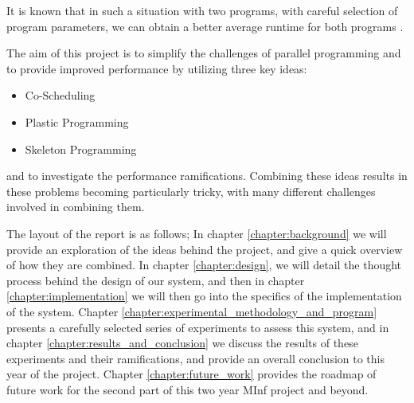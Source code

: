 It is known that in such a situation with two programs, with careful selection of program parameters, we can obtain a better average runtime for both programs \cite{lira}.

The aim of this project is to simplify the challenges of parallel programming and to provide improved performance by utilizing three key ideas:

\begin{itemize}
	\item Co-Scheduling
	\item Plastic Programming
	\item Skeleton Programming
\end{itemize}

and to investigate the performance ramifications. Combining these ideas results in these problems becoming particularly tricky, with many different challenges involved in combining them.

The layout of the report is as follows; In chapter \ref{chapter:background} we will provide an exploration of the ideas behind the project, and give a quick overview of how they are combined. In chapter \ref{chapter:design}, we will detail the thought process behind the design of our system, and then in chapter \ref{chapter:implementation} we will then go into the specifics of the implementation of the system. Chapter \ref{chapter:experimental_methodology_and_program} presents a carefully selected series of experiments to assess this system, and in chapter \ref{chapter:results_and_conclusion} we discuss the results of these experiments and their ramifications, and provide an overall conclusion to this year of the project. Chapter \ref{chapter:future_work} provides the roadmap of future work for the second part of this two year MInf project and beyond.